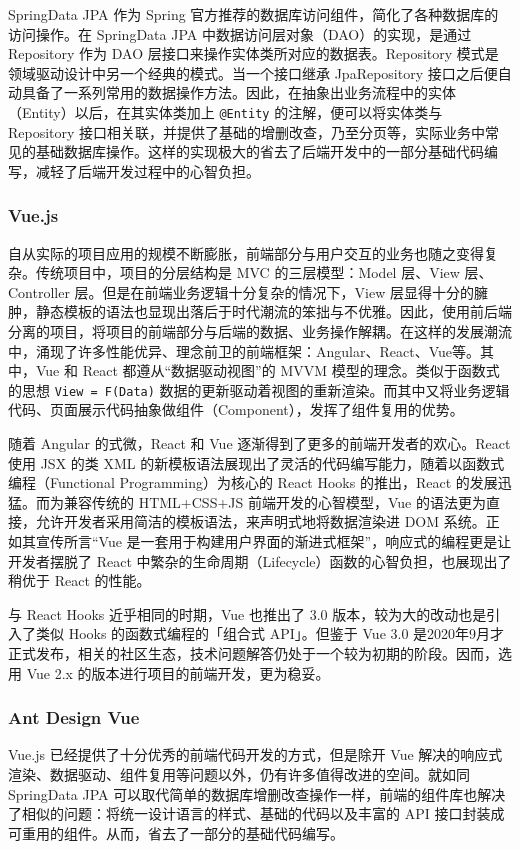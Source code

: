 SpringData JPA 作为 Spring 官方推荐的数据库访问组件，简化了各种数据库的访问操作。在 SpringData JPA 中数据访问层对象（DAO）的实现，是通过 Repository 作为 DAO 层接口来操作实体类所对应的数据表。Repository 模式是领域驱动设计中另一个经典的模式。当一个接口继承 JpaRepository 接口之后便自动具备了一系列常用的数据操作方法。因此，在抽象出业务流程中的实体（Entity）以后，在其实体类加上  \lstinline!@Entity! 的注解，便可以将实体类与 Repository 接口相关联，并提供了基础的增删改查，乃至分页等，实际业务中常见的基础数据库操作。这样的实现极大的省去了后端开发中的一部分基础代码编写，减轻了后端开发过程中的心智负担。

\subsubsection{Vue.js}
自从实际的项目应用的规模不断膨胀，前端部分与用户交互的业务也随之变得复杂。传统项目中，项目的分层结构是 MVC 的三层模型：Model 层、View 层、Controller 层。但是在前端业务逻辑十分复杂的情况下，View 层显得十分的臃肿，静态模板的语法也显现出落后于时代潮流的笨拙与不优雅。因此，使用前后端分离的项目，将项目的前端部分与后端的数据、业务操作解耦。在这样的发展潮流中，涌现了许多性能优异、理念前卫的前端框架：Angular、React、Vue等。其中，Vue 和 React 都遵从“数据驱动视图”的 MVVM 模型的理念。类似于函数式的思想 \lstinline!View = F(Data)! 数据的更新驱动着视图的重新渲染。而其中又将业务逻辑代码、页面展示代码抽象做组件（Component），发挥了组件复用的优势。

随着 Angular 的式微，React 和 Vue 逐渐得到了更多的前端开发者的欢心。React 使用 JSX 的类 XML 的新模板语法展现出了灵活的代码编写能力，随着以函数式编程（Functional Programming）为核心的 React Hooks 的推出，React 的发展迅猛。而为兼容传统的 HTML+CSS+JS 前端开发的心智模型，Vue 的语法更为直接，允许开发者采用简洁的模板语法，来声明式地将数据渲染进 DOM 系统。正如其宣传所言“Vue 是一套用于构建用户界面的渐进式框架”，响应式的编程更是让开发者摆脱了 React 中繁杂的生命周期（Lifecycle）函数的心智负担，也展现出了稍优于 React 的性能。

与 React Hooks 近乎相同的时期，Vue 也推出了 3.0 版本，较为大的改动也是引入了类似 Hooks 的函数式编程的「组合式 API」。但鉴于 Vue 3.0 是2020年9月才正式发布，相关的社区生态，技术问题解答仍处于一个较为初期的阶段。因而，选用 Vue 2.x 的版本进行项目的前端开发，更为稳妥。

\subsubsection{Ant Design Vue}
Vue.js 已经提供了十分优秀的前端代码开发的方式，但是除开 Vue 解决的响应式渲染、数据驱动、组件复用等问题以外，仍有许多值得改进的空间。就如同 SpringData JPA 可以取代简单的数据库增删改查操作一样，前端的组件库也解决了相似的问题：将统一设计语言的样式、基础的代码以及丰富的 API 接口封装成可重用的组件。从而，省去了一部分的基础代码编写。

